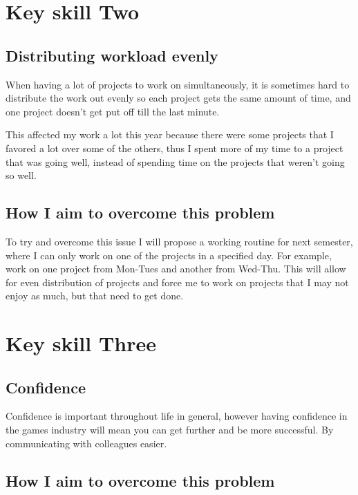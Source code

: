 \documentclass{scrartcl}
\begin{document}
\section{Key skill Two}
\subsection{Distributing workload evenly}
When having a lot of projects to work on simultaneously, it is sometimes hard to distribute the work out evenly so each project gets the same amount of time, and one project doesn't get put off till the last minute. 

This affected my work a lot this year because there were some projects that I favored a lot over some of the others, thus I spent more of my time to a project that was going well, instead of spending time on the projects that weren't going so well.

\subsection{How I aim to overcome this problem}
To try and overcome this issue I will propose a working routine for next semester, where I can only work on one of the projects in a specified day. For example, work on one project from Mon-Tues and another from Wed-Thu. This will allow for even distribution of projects and force me to work on projects that I may not enjoy as much, but that need to get done.


\section{Key skill Three}
\subsection{Confidence}

Confidence is important throughout life in general, however having confidence in the games industry will mean you can get further and be more successful. By communicating with colleagues easier.




\subsection{How I aim to overcome this problem}
\end{document}
